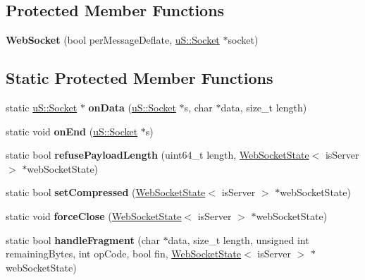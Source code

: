 \subsection*{Protected Member Functions}
\begin{DoxyCompactItemize}
\item 
\mbox{\label{structu_w_s_1_1_web_socket_a37d2d26365abc721fd28a328410de016}} 
{\bfseries Web\+Socket} (bool per\+Message\+Deflate, \mbox{\hyperlink{structu_s_1_1_socket}{u\+S\+::\+Socket}} $\ast$socket)
\end{DoxyCompactItemize}
\subsection*{Static Protected Member Functions}
\begin{DoxyCompactItemize}
\item 
\mbox{\label{structu_w_s_1_1_web_socket_a255a3ee0ad980aa7b367e638d7884abe}} 
static \mbox{\hyperlink{structu_s_1_1_socket}{u\+S\+::\+Socket}} $\ast$ {\bfseries on\+Data} (\mbox{\hyperlink{structu_s_1_1_socket}{u\+S\+::\+Socket}} $\ast$s, char $\ast$data, size\+\_\+t length)
\item 
\mbox{\label{structu_w_s_1_1_web_socket_aa29241e250a9897464814d09d58a22cc}} 
static void {\bfseries on\+End} (\mbox{\hyperlink{structu_s_1_1_socket}{u\+S\+::\+Socket}} $\ast$s)
\item 
\mbox{\label{structu_w_s_1_1_web_socket_a011523be4a9dd4f5e2d7c0fec62accad}} 
static bool {\bfseries refuse\+Payload\+Length} (uint64\+\_\+t length, \mbox{\hyperlink{structu_w_s_1_1_web_socket_state}{Web\+Socket\+State}}$<$ is\+Server $>$ $\ast$web\+Socket\+State)
\item 
\mbox{\label{structu_w_s_1_1_web_socket_adbfe05565fb3d6d345b003bab8c1b1b0}} 
static bool {\bfseries set\+Compressed} (\mbox{\hyperlink{structu_w_s_1_1_web_socket_state}{Web\+Socket\+State}}$<$ is\+Server $>$ $\ast$web\+Socket\+State)
\item 
\mbox{\label{structu_w_s_1_1_web_socket_af8f1b59dac62f4a3a8ce6f4c5ebbf5e4}} 
static void {\bfseries force\+Close} (\mbox{\hyperlink{structu_w_s_1_1_web_socket_state}{Web\+Socket\+State}}$<$ is\+Server $>$ $\ast$web\+Socket\+State)
\item 
\mbox{\label{structu_w_s_1_1_web_socket_ac010910abc21d49391ca890b0eba18c4}} 
static bool {\bfseries handle\+Fragment} (char $\ast$data, size\+\_\+t length, unsigned int remaining\+Bytes, int op\+Code, bool fin, \mbox{\hyperlink{structu_w_s_1_1_web_socket_state}{Web\+Socket\+State}}$<$ is\+Server $>$ $\ast$web\+Socket\+State)
\end{DoxyCompactItemize}
